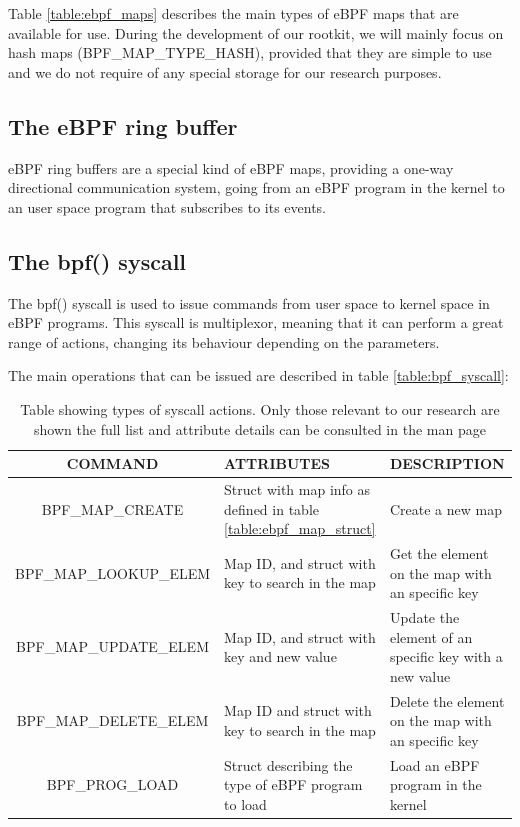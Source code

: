 \documentclass[12pt]{report} %
\begin{document}
Table \ref{table:ebpf_maps} describes the main types of eBPF maps that are available for use. During the development of our rootkit, we will mainly focus on hash maps (BPF\_MAP\_TYPE\_HASH), provided that they are simple to use and we do not require of any special storage for our research purposes.

\subsection{The eBPF ring buffer} \label{subsection:bpf_ring_buf}
eBPF ring buffers are a special kind of eBPF maps, providing a one-way directional communication system, going from an eBPF program in the kernel to an user space program that subscribes to its events.


\subsection{The bpf() syscall} \label{subsection:bpf_syscall}
The bpf() syscall is used to issue commands from user space to kernel space in eBPF programs. This syscall is multiplexor, meaning that it can perform a great range of actions, changing its behaviour depending on the parameters.

The main operations that can be issued are described in table \ref{table:bpf_syscall}:

\begin{table}[H]
\begin{tabular}{|c|>{\centering\arraybackslash}p{5cm}|>{\centering\arraybackslash}p{5cm}|}
\hline
COMMAND & ATTRIBUTES & DESCRIPTION\\
\hline
\hline
BPF\_MAP\_CREATE & Struct with map info as defined in table \ref{table:ebpf_map_struct} & Create a new map\\
\hline
BPF\_MAP\_LOOKUP\_ELEM & Map ID, and struct with key to search in the map & Get the element on the map with an specific key\\
\hline
BPF\_MAP\_UPDATE\_ELEM & Map ID, and struct with key and new value & Update the element of an specific key with a new value\\
\hline
BPF\_MAP\_DELETE\_ELEM & Map ID and struct with key to search in the map & Delete the element on the map with an specific key\\
\hline
BPF\_PROG\_LOAD & Struct describing the type of eBPF program to load & Load an eBPF program in the kernel\\
\hline
\end{tabular}
\caption{Table showing types of syscall actions. Only those relevant to our research are shown the full list and attribute details can be consulted in the man page \cite{bpf_syscall}}
\label{table:ebpf_syscall}
\end{table}
\end{document}
